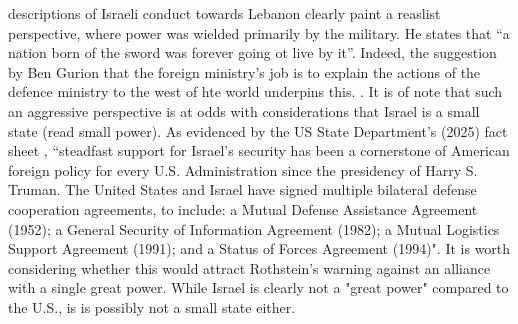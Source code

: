 \parencite{HIRST_2010} descriptions of Israeli conduct towards Lebanon clearly paint a reaslist perspective, where power was wielded primarily by the military. He states that ``a nation born of the sword was forever going ot live by it''. Indeed, the suggestion by Ben Gurion that the foreign ministry's job is to explain the actions of the defence ministry to the west of hte world underpins this. \parencite[p. 53]{HIRST_2010}. It is of note that such an aggressive perspective is at odds with considerations that Israel is a small state (read small power). As evidenced by the US State Department's (2025) fact sheet \nocite{STATEDEPT_2025}, ``steadfast support for Israel's security has been a cornerstone of American foreign policy for every U.S. Administration since the presidency of Harry S. Truman. The United States and Israel have signed multiple bilateral defense cooperation agreements, to include: a Mutual Defense Assistance Agreement (1952); a General Security of Information Agreement (1982); a Mutual Logistics Support Agreement (1991); and a Status of Forces Agreement (1994)". It is worth considering whether this would attract Rothstein's warning against an alliance with a single great power. While Israel is clearly not a "great power" compared to the U.S., is is possibly not a small state either.
                                                                                                                              

